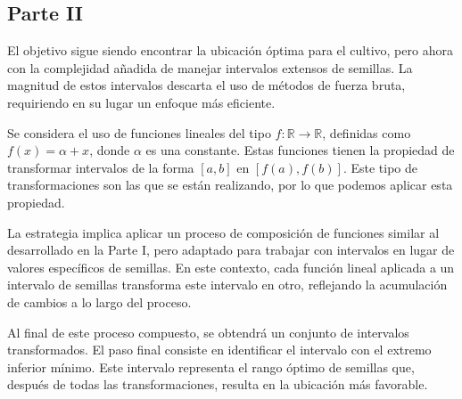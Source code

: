 \documentclass[a4paper,12pt]{article}
\begin{document}
\subsection{Parte II}

El objetivo sigue siendo encontrar la ubicación óptima para el cultivo, pero ahora con la complejidad añadida de manejar intervalos extensos de semillas. La magnitud de estos intervalos descarta el uso de métodos de fuerza bruta, requiriendo en su lugar un enfoque más eficiente.

Se considera el uso de funciones lineales del tipo $f: \mathbb{R} \longrightarrow \mathbb{R}$, definidas como $f(x) = \alpha + x$, donde $\alpha$ es una constante. Estas funciones tienen la propiedad de transformar intervalos de la forma $[a, b]$ en $[f(a), f(b)]$. Este tipo de transformaciones son las que se están realizando, por lo que podemos aplicar esta propiedad.

La estrategia implica aplicar un proceso de composición de funciones similar al desarrollado en la Parte I, pero adaptado para trabajar con intervalos en lugar de valores específicos de semillas. En este contexto, cada función lineal aplicada a un intervalo de semillas transforma este intervalo en otro, reflejando la acumulación de cambios a lo largo del proceso.

Al final de este proceso compuesto, se obtendrá un conjunto de intervalos transformados. El paso final consiste en identificar el intervalo con el extremo inferior mínimo. Este intervalo representa el rango óptimo de semillas que, después de todas las transformaciones, resulta en la ubicación más favorable. 
\end{document}
